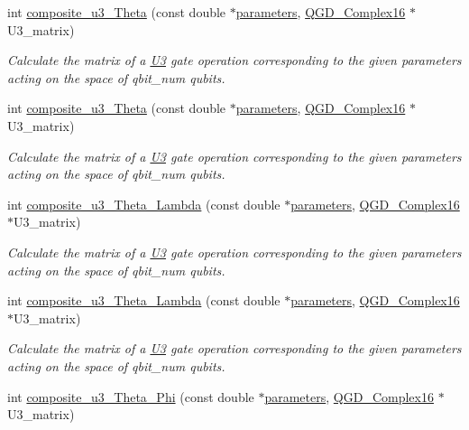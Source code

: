 \begin{DoxyCompactItemize}
int \hyperlink{class_u3_a9a88133c5aa2ced80da763991f1ca171}{composite\+\_\+u3\+\_\+\+Theta} (const double $\ast$\hyperlink{class_u3_a6b07be37e63be67b306393a90d759f70}{parameters}, \hyperlink{struct_q_g_d___complex16}{Q\+G\+D\+\_\+\+Complex16} $\ast$U3\+\_\+matrix)
\begin{DoxyCompactList}\small\item\em Calculate the matrix of a \hyperlink{class_u3}{U3} gate operation corresponding to the given parameters acting on the space of qbit\+\_\+num qubits. \end{DoxyCompactList}\item 
int \hyperlink{class_u3_a9a88133c5aa2ced80da763991f1ca171}{composite\+\_\+u3\+\_\+\+Theta} (const double $\ast$\hyperlink{class_u3_a6b07be37e63be67b306393a90d759f70}{parameters}, \hyperlink{struct_q_g_d___complex16}{Q\+G\+D\+\_\+\+Complex16} $\ast$U3\+\_\+matrix)
\begin{DoxyCompactList}\small\item\em Calculate the matrix of a \hyperlink{class_u3}{U3} gate operation corresponding to the given parameters acting on the space of qbit\+\_\+num qubits. \end{DoxyCompactList}\item 
int \hyperlink{class_u3_a7400c9ccdef71ffa60f984c8e10ad4cb}{composite\+\_\+u3\+\_\+\+Theta\+\_\+\+Lambda} (const double $\ast$\hyperlink{class_u3_a6b07be37e63be67b306393a90d759f70}{parameters}, \hyperlink{struct_q_g_d___complex16}{Q\+G\+D\+\_\+\+Complex16} $\ast$U3\+\_\+matrix)
\begin{DoxyCompactList}\small\item\em Calculate the matrix of a \hyperlink{class_u3}{U3} gate operation corresponding to the given parameters acting on the space of qbit\+\_\+num qubits. \end{DoxyCompactList}\item 
int \hyperlink{class_u3_a7400c9ccdef71ffa60f984c8e10ad4cb}{composite\+\_\+u3\+\_\+\+Theta\+\_\+\+Lambda} (const double $\ast$\hyperlink{class_u3_a6b07be37e63be67b306393a90d759f70}{parameters}, \hyperlink{struct_q_g_d___complex16}{Q\+G\+D\+\_\+\+Complex16} $\ast$U3\+\_\+matrix)
\begin{DoxyCompactList}\small\item\em Calculate the matrix of a \hyperlink{class_u3}{U3} gate operation corresponding to the given parameters acting on the space of qbit\+\_\+num qubits. \end{DoxyCompactList}\item 
int \hyperlink{class_u3_a612a9f7b336c2ad7714945747c0591f8}{composite\+\_\+u3\+\_\+\+Theta\+\_\+\+Phi} (const double $\ast$\hyperlink{class_u3_a6b07be37e63be67b306393a90d759f70}{parameters}, \hyperlink{struct_q_g_d___complex16}{Q\+G\+D\+\_\+\+Complex16} $\ast$U3\+\_\+matrix)

\end{DoxyCompactItemize}
